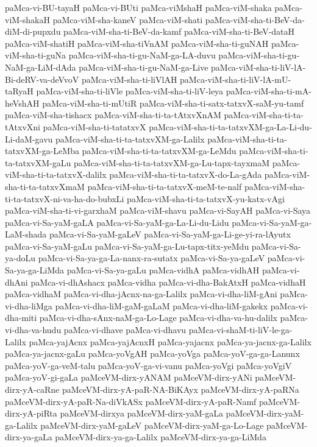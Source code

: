 {paMca-vi-BU-tayaH
paMca-vi-BUti
paMca-viMshaH
paMca-viM-shaka
paMca-viM-shakaH
paMca-viM-sha-kaneV
paMca-viM-shati
paMca-viM-sha-ti-BeV-da-diM-di-pupxdu
paMca-viM-sha-ti-BeV-da-kamf
paMca-viM-sha-ti-BeV-dataH
paMca-viM-shatiH
paMca-viM-sha-tiVnAM
paMca-viM-sha-ti-guNAH
paMca-viM-sha-ti-guNa
paMca-viM-sha-ti-gu-NaM-ga-LA-duvu
paMca-viM-sha-ti-gu-NaM-ga-LiM-dAda
paMca-viM-sha-ti-gu-NaM-ga-Live
paMca-viM-sha-ti-liV-lA-Bi-deRV-va-deVvoV
paMca-viM-sha-ti-liVlAH
paMca-viM-sha-ti-liV-lA-mU-taRyaH
paMca-viM-sha-ti-liVle
paMca-viM-sha-ti-liV-leya
paMca-viM-sha-ti-mA-heVshAH
paMca-viM-sha-ti-mUtiR
paMca-viM-sha-ti-satx-tatxvX-saM-yu-tamf
paMca-viM-sha-tishacx
paMca-viM-sha-ti-ta-tAtxvXnAM
paMca-viM-sha-ti-ta-tAtxvXni
paMca-viM-sha-ti-tatatxvX
paMca-viM-sha-ti-ta-tatxvXM-ga-La-Li-du-Li-daM-gavu
paMca-viM-sha-ti-ta-tatxvXM-ga-Lalilx
paMca-viM-sha-ti-ta-tatxvXM-ga-LeMba
paMca-viM-sha-ti-ta-tatxvXM-ga-LeMdu
paMca-viM-sha-ti-ta-tatxvXM-gaLu
paMca-viM-sha-ti-ta-tatxvXM-ga-Lu-tapx-tayxmaM
paMca-viM-sha-ti-ta-tatxvX-dalilx
paMca-viM-sha-ti-ta-tatxvX-do-La-gAda
paMca-viM-sha-ti-ta-tatxvXmaM
paMca-viM-sha-ti-ta-tatxvX-meM-te-nalf
paMca-viM-sha-ti-ta-tatxvX-ni-va-ha-do-bubxLi
paMca-viM-sha-ti-ta-tatxvX-yu-katx-vAgi
paMca-viM-sha-ti-vi-garxhaM
paMca-viM-shavu
paMca-vi-SayAH
paMca-vi-Saya
paMca-vi-Sa-yaM-gaLA
paMca-vi-Sa-yaM-ga-La-Li-du-Lidu
paMca-vi-Sa-yaM-ga-LaM-shada
paMca-vi-Sa-yaM-gaLeV
paMca-vi-Sa-yaM-ga-Li-ge-yi-ra-lAyutx
paMca-vi-Sa-yaM-gaLu
paMca-vi-Sa-yaM-ga-Lu-tapx-titx-yeMdu
paMca-vi-Sa-ya-doLu
paMca-vi-Sa-ya-ga-La-nanx-ra-sutatx
paMca-vi-Sa-ya-gaLeV
paMca-vi-Sa-ya-ga-LiMda
paMca-vi-Sa-ya-gaLu
paMca-vidhA
paMca-vidhAH
paMca-vi-dhAni
paMca-vi-dhAshacx
paMca-vidha
paMca-vi-dha-BakAtxH
paMca-vidhaH
paMca-vidhaM
paMca-vi-dha-jAcnx-na-ga-Lalilx
paMca-vi-dha-liM-gAni
paMca-vi-dha-liMga
paMca-vi-dha-liM-gaM-gaLaM
paMca-vi-dha-liM-gakekx
paMca-vi-dha-miti
paMca-vi-dha-sAnx-naM-ga-Lo-Lage
paMca-vi-dha-va-hu-dalilx
paMca-vi-dha-va-hudu
paMca-vi-dhave
paMca-vi-dhavu
paMca-vi-shaM-ti-liV-le-ga-Lalilx
paMca-yajAcnx
paMca-yajAcnxH
paMca-yajacnx
paMca-ya-jacnx-ga-Lalilx
paMca-ya-jacnx-gaLu
paMca-yoVgAH
paMca-yoVga
paMca-yoV-ga-ga-Lanunx
paMca-yoV-ga-veM-talu
paMca-yoV-ga-vi-vanu
paMca-yoVgi
paMca-yoVgiV
paMca-yoV-gi-gaLa
paMceVM-dirx-yANAM
paMceVM-dirx-yANi
paMceVM-dirx-yA-caRne
paMceVM-dirx-yA-paR-NA-BiKAyx
paMceVM-dirx-yA-paRNa
paMceVM-dirx-yA-paR-Na-diVkASx
paMceVM-dirx-yA-paR-Namf
paMceVM-dirx-yA-piRta
paMceVM-dirxya
paMceVM-dirx-yaM-gaLa
paMceVM-dirx-yaM-ga-Lalilx
paMceVM-dirx-yaM-gaLeV
paMceVM-dirx-yaM-ga-Lo-Lage
paMceVM-dirx-ya-gaLa
paMceVM-dirx-ya-ga-Lalilx
paMceVM-dirx-ya-ga-LiMda
}
